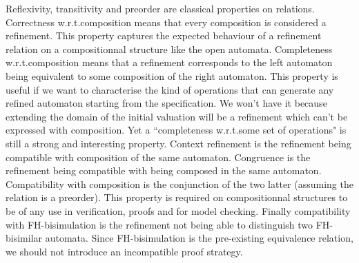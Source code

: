 \documentclass{article}
\begin{document}
Reflexivity, transitivity and preorder are classical properties on relations.
Correctness w.r.t.\@ composition means that every composition is considered a refinement.
This property captures the expected behaviour of a refinement relation on a compositionnal structure like the open automata.
Completeness w.r.t.\@ composition means that a refinement corresponds to the left automaton being equivalent to some composition of the right automaton.
This property is useful if we want to characterise the kind of operations that can generate any refined automaton starting from the specification.
We won't have it because extending the domain of the initial valuation will be a refinement which can't be expressed with composition.
Yet a ``completeness w.r.t.\@ some set of operations" is still a strong and interesting property.
Context refinement is the refinement being compatible with composition of the same automaton.
Congruence is the refinement being compatible with being composed in the same automaton.
Compatibility with composition is the conjunction of the two latter (assuming the relation is a preorder).
This property is required on compositionnal structures to be of any use in verification, proofs and for model checking.
Finally compatibility with FH-bisimulation is the refinement not being able to distinguish two FH-bisimilar automata.
Since FH-bisimulation is the pre-existing equivalence relation, we should not introduce an incompatible proof strategy.
\end{document}
